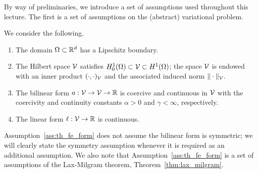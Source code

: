 
By way of preliminaries, we introduce a set of assumptions used throughout this lecture.  The first is a set of assumptions on the (abstract) variational problem.
\begin{assumption}
  \label{ass:th_fe_form}
  We consider the following.
  \begin{enumerate}
  \item The domain $\Omega \subset \mathbb{R}^d$ has a Lipschitz boundary.
  \item The Hilbert space $\mathcal{V}$ satisfies $H^1_0(\Omega) \subset \mathcal{V} \subset H^1(\Omega)$; the space $\mathcal{V}$ is endowed with an inner product $(\cdot,\cdot)_{\mathcal{V}}$ and the associated induced norm $\| \cdot \|_{\mathcal{V}}$.
  \item The bilinear form $a: \mathcal{V} \to \mathcal{V} \to \mathbb{R}$ is coercive and continuous in $\mathcal{V}$ with the coercivity and continuity constants $\alpha > 0$ and $\gamma < \infty$, respectively.
  \item The linear form $\ell: \mathcal{V} \to \mathbb{R}$ is continuous.
  \end{enumerate}
\end{assumption}
Assumption~\ref{ass:th_fe_form} does not assume the bilinear form is symmetric; we will clearly state the symmetry assumption whenever it is required as an additional assumption.  We also note that Assumption~\ref{ass:th_fe_form} is a set of assumptions of the Lax-Milgram theorem, Theorem~\ref{thm:lax_milgram}.

